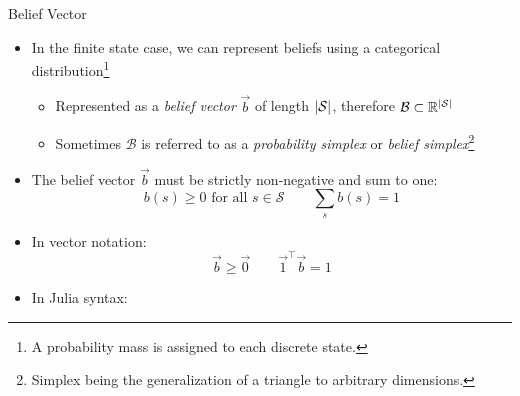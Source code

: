 \begin{frame}[fragile]{Belief Vector}

\begin{itemize}
    \item In the finite state case, we can represent beliefs using a categorical distribution\footnote{A probability mass is assigned to each discrete state.}
    \begin{itemize}
        \item Represented as a \textit{belief vector} $\vec{b}$ of length $\lvert\mathcal{S}\rvert$, therefore $\mathcal{B} \subset \mathbb{R}^{\lvert\mathcal{S}\rvert}$
        \item Sometimes $\mathcal{B}$ is referred to as a \textit{probability simplex} or \textit{belief simplex}\footnote{Simplex being the generalization of a triangle to arbitrary dimensions.}
    \end{itemize}
\end{itemize}


\begin{itemize}
    \item The belief vector $\vec{b}$ must be strictly non-negative and sum to one:
    \begin{equation*}
        b(s) \ge 0 \text{ for all } s \in \mathcal{S} \qquad \sum_s b(s) = 1
    \end{equation*}
    \item In vector notation:
    \begin{equation*}
        \vec{b} \ge \vec{0} \qquad \vec{1}^\top \vec{b} = 1
    \end{equation*}
    \item In Julia syntax:
\begin{center}
\end{center}
\end{itemize}

\end{frame}